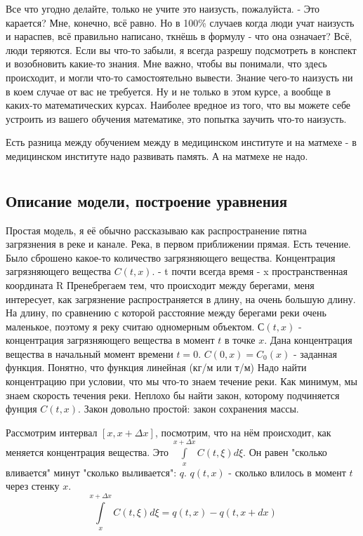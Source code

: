Все что угодно делайте, только не учите это наизусть, пожалуйста.
- Это карается?
Мне, конечно, всё равно. Но в 100\% случаев когда люди учат наизусть и нараспев, всё правильно написано, ткнёшь в формулу - что она означает? Всё, люди теряются. Если вы что-то забыли, я всегда разрешу подсмотреть в конспект и  возобновить какие-то знания. Мне важно, чтобы вы понимали, что здесь происходит, и могли что-то самостоятельно вывести. Знание чего-то наизусть ни в коем случае от вас не требуется. Ну и не только в этом курсе, а вообще в каких-то математических курсах. Наиболее вредное из того, что вы можете себе устроить из вашего обучения математике, это попытка заучить что-то наизусть.

Есть разница между обучением между в медицинском институте и на матмехе - в медицинском институте надо развивать память. А на матмехе не надо.


\chapter{}
\section{Описание модели, построение уравнения}
Простая модель, я её обычно рассказываю как распространение пятна загрязнения в реке и канале. Река, в первом приближении прямая. Есть течение. Было сброшено какое-то количество загрязняющего вещества. Концентрация загрязняющего вещества  $C(t,x)$.
- t почти всегда время
- x пространственная координата R
Пренебрегаем тем, что происходит между берегами, меня интересует, как загрязнение распространяется в длину, на очень большую длину. На длину, по сравнению с которой расстояние между берегами реки очень маленькое, поэтому я реку считаю одномерным объектом.
$С(t, x)$ - концентрация загрязняющего вещества в момент $t$ в точке $x$.
Дана концентрация вещества в начальный момент времени $t = 0$.
$C(0, x) = C_0(x)$ - заданная функция.
Понятно, что функция линейная (кг/м или т/м)
Надо найти концентрацию при условии, что мы что-то знаем течение реки. Как минимум, мы знаем скорость течения реки. Неплохо бы найти закон, которому подчиняется фунция $C(t,x)$. Закон довольно простой: закон сохранения массы.

Рассмотрим интервал $[x, x + \Delta x]$, посмотрим, что на нём происходит, как меняется концентрация вещества. Это $\displaystyle \int \limits_x^{x + \Delta x} C(t, \xi) d \xi$. Он равен "сколько вливается" минут "сколько выливается": $q$. $q(t, x)$ - сколько влилось в момент $t$ через стенку $x$.
$$\displaystyle \int \limits_x^{x + \Delta x} \! C(t, \xi) d \xi = q(t, x) - q(t, x + dx)$$

